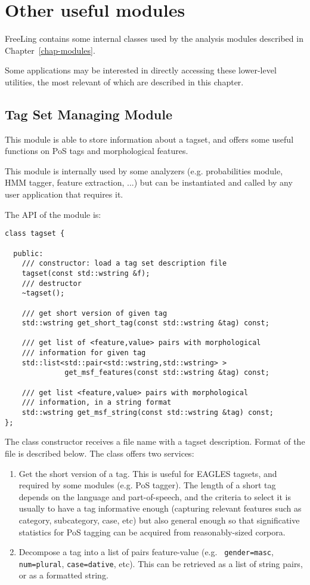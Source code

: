 \documentclass[a4paper]{book}
\begin{document}
\chapter{Other useful modules}

 FreeLing contains some internal classes used by the analysis modules 
described in Chapter~\ref{chap-modules}. 

 Some applications may be interested in directly accessing these lower-level
utilities, the most relevant of which are described in this chapter.

\section{Tag Set Managing Module}
\label{file-tagset}

 This module is able to store information about a tagset, and offers some 
useful functions on PoS tags and morphological features.

 This module is internally used by some analyzers (e.g. probabilities module, 
HMM tagger, feature extraction, ...) but can be instantiated and called by
any user application that requires it.

  The API of the module is: 
\begin{verbatim}
class tagset {
 
  public:
    /// constructor: load a tag set description file
    tagset(const std::wstring &f);
    /// destructor
    ~tagset();

    /// get short version of given tag
    std::wstring get_short_tag(const std::wstring &tag) const;

    /// get list of <feature,value> pairs with morphological
    /// information for given tag
    std::list<std::pair<std::wstring,std::wstring> >
              get_msf_features(const std::wstring &tag) const;

    /// get list <feature,value> pairs with morphological 
    /// information, in a string format
    std::wstring get_msf_string(const std::wstring &tag) const;
};
\end{verbatim}

  The class constructor receives a file name with a tagset description. Format of the file 
  is described below.  The class offers two services: 
  \begin{enumerate} 
  \item Get the short version of a tag. This is useful for EAGLES tagsets, and required by some 
   modules (e.g. PoS tagger). The length of a short tag depends on the language and part-of-speech,
   and the criteria to select it is usually to have a tag informative enough (capturing relevant
   features such as category, subcategory, case, etc) but also general enough so that significative
   statistics for PoS tagging can be acquired from reasonably-sized corpora.
  \item Decompose a tag into a list of pairs feature-value (e.g. {\tt
    gender=masc}, {\tt num=plural}, {\tt case=dative}, etc).  This can be retrieved 
    as a list of string pairs, or as a formatted string.
  \end{enumerate} 
\end{document}
